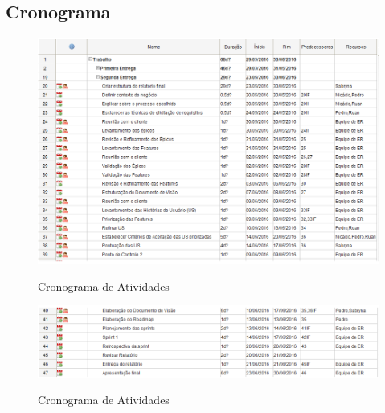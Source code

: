 \begin{apendicesenv}
\partapendices
\chapter{Cronograma}
\label{sec:cronograma}
\FloatBarrier
\begin{figure}[!htpd]
		\centering
		\includegraphics[scale=0.5]{figuras/cron1}
		\label{img:cronograma}
		\caption{Cronograma de Atividades}
\end{figure}
\FloatBarrier

\FloatBarrier
\begin{figure}[!htpd]
		\centering
		\includegraphics[scale=0.5]{figuras/cron2}
		\label{img:cronograma}
		\caption{Cronograma de Atividades}
\end{figure}
\FloatBarrier


\end{apendicesenv}
